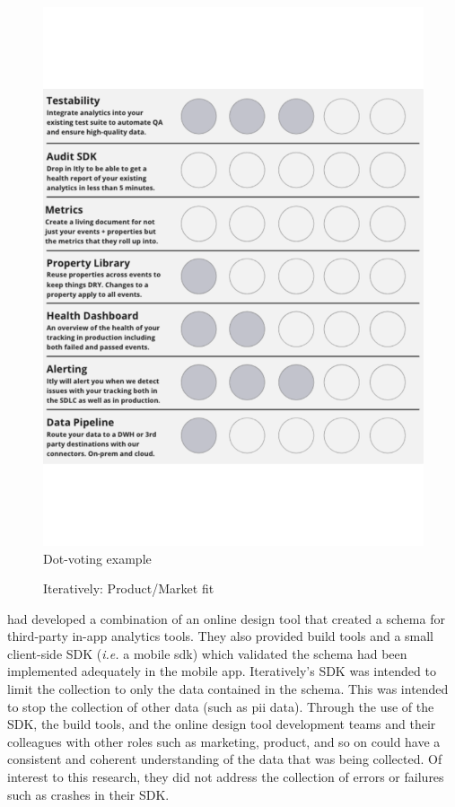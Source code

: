 \begin{figure}
\begin{minipage}{.47\linewidth}
  \includegraphics[width=\linewidth]{images/iteratively/dot-voting-example.pdf}
  {\footnotesize Dot-voting example}
  \label{fig:iteratively-dot-voting-example}
\end{minipage}%
    \caption{Iteratively: Product/Market fit}
    \label{fig:iteratively-product-market-fit}
\end{figure}

 had developed a combination of an online design tool that created a schema for third-party in-app analytics tools. They also provided build tools and a small client-side SDK (\emph{i.e.} a mobile \Gls{sdk}) which validated the schema had been implemented adequately in the mobile app. %
Iteratively's SDK was intended to limit the collection to only the data contained in the schema. This was intended to stop the collection of other data (such as \Gls{pii} data). Through the use of the SDK, the build tools, and the online design tool development teams and their colleagues with other roles such as marketing, product, and so on could have a consistent and coherent understanding of the data that was being collected. Of interest to this research, they did not address the collection of errors or failures such as crashes in their SDK.

